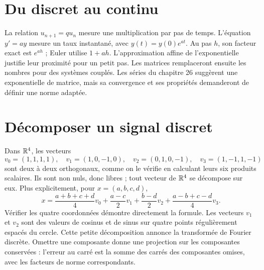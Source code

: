\documentclass[../cours_1re.tex]{subfiles}
\begin{document}
\section{Du discret au continu}
La relation $u_{n+1}=qu_n$ mesure une multiplication par pas de temps.
L'équation $y'=ay$ mesure un taux instantané, avec $y(t)=y(0)e^{at}$.
Au pas $h$, son facteur exact est $e^{ah}$ ; Euler utilise $1+ah$.
L'approximation affine de l'exponentielle justifie leur proximité pour un petit pas.
Les matrices remplaceront ensuite les nombres pour des systèmes couplés.
Les séries du chapitre 26 suggèrent une exponentielle de matrice,
mais sa convergence et ses propriétés demanderont de définir une norme adaptée.

\section{Décomposer un signal discret}
Dans $\mathbb{R}^4$, les vecteurs
\[
v_0=(1,1,1,1),\quad v_1=(1,0,-1,0),\quad
v_2=(0,1,0,-1),\quad v_3=(1,-1,1,-1)
\]
sont deux à deux orthogonaux, comme on le vérifie en calculant leurs six
produits scalaires. Ils sont non nuls, donc libres ; tout vecteur de $\mathbb{R}^4$
se décompose sur eux. Plus explicitement, pour $x=(a,b,c,d)$,
\[
x=\frac{a+b+c+d}{4}v_0+\frac{a-c}{2}v_1
+\frac{b-d}{2}v_2+\frac{a-b+c-d}{4}v_3.
\]
Vérifier les quatre coordonnées démontre directement la formule.
Les vecteurs $v_1$ et $v_2$ sont des valeurs de cosinus et de sinus sur
quatre points régulièrement espacés du cercle. Cette petite décomposition
annonce la transformée de Fourier discrète.
Omettre une composante donne une projection sur les composantes conservées :
l'erreur au carré est la somme des carrés des composantes omises,
avec les facteurs de norme correspondants.
\end{document}
